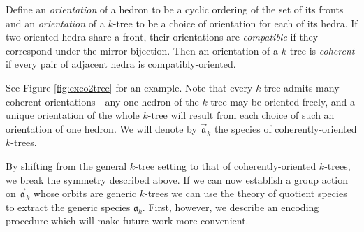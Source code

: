 \documentclass[sectionflow,singlespace,twoside,boldmathhdr,draft]{brandiss} %
\numberwithin{section}{chapter}
\numberwithin{figure}{chapter}
\begin{document}
\begin{comment} Don't think we need this after all...
  \begin{definition}\label{def:cycord}
    For a set $A$, define a \emph{cyclic order of $A$} to be a labeling of the cyclic digraph $\overrightarrow{C}_{\abs{A}}$ by $A$ and let $\cyc A$ be the set of such linear orders. Let $\lin A$ be the set of linear orders on $A$. Let $\psi_{A}: \lin A \to \cyc A$ (hereafter denoted simply $\psi$ when the set is unambiguous) send each linear order $\ell$ to the cyclic order obtained by decorating $\overrightarrow{C}_{\abs{A}}$ with $\ell$ in order. (Note that this map is $\abs{A}$-to-one.) Then a \emph{linearization} of a given cyclic order $c \in \cyc A$ is an element of $\psi^{-1} \pbrac{c}$.
  \end{definition}
\end{comment}

\begin{definition}
  \label{def:coktree}
  Define an \emph{orientation} of a hedron to be a cyclic ordering of the set of its fronts and an \emph{orientation} of a $k$-tree to be a choice of orientation for each of its hedra.
  If two oriented hedra share a front, their orientations are \emph{compatible} if they correspond under the mirror bijection.
  Then an orientation of a $k$-tree is \emph{coherent} if every pair of adjacent hedra is compatibly-oriented.
\end{definition}
See Figure \ref{fig:exco2tree} for an example.
Note that every $k$-tree admits many coherent orientations---any one hedron of the $k$-tree may be oriented freely, and a unique orientation of the whole $k$-tree will result from each choice of such an orientation of one hedron.
We will denote by $\vec{\mathfrak{a}}_{k}$ the species of coherently-oriented $k$-trees.

By shifting from the general $k$-tree setting to that of coherently-oriented $k$-trees, we break the symmetry described above.
If we can now establish a group action on $\vec{\mathfrak{a}}_{k}$ whose orbits are generic $k$-trees we can use the theory of quotient species to extract the generic species $\mathfrak{a}_{k}$.
First, however, we describe an encoding procedure which will make future work more convenient.
\end{document}

